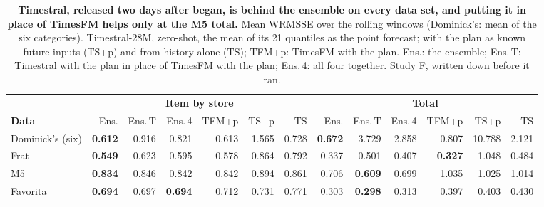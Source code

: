 \begin{table}[t]
\centering
\caption{\textbf{Timestral, released two days after \thisrev{} began, is behind the ensemble on every data set, and
putting it in place of TimesFM helps only at the M5 total.} Mean WRMSSE over the rolling windows (Dominick's: mean
of the six categories). Timestral-28M, zero-shot, the mean of its 21 quantiles as the point forecast; with the plan as
known future inputs (TS+p) and from history alone (TS); TFM+p: TimesFM with the plan. Ens.: the ensemble; Ens.\,T:
Timestral with the plan in place of TimesFM with the plan; Ens.\,4: all four together. Study F, written down before it ran.}
\label{tab:timestral}
\footnotesize
\setlength{\tabcolsep}{3pt}
\begin{tabular}{l*{12}{r}}
\toprule
 & \multicolumn{6}{c}{\textbf{Item by store}} & \multicolumn{6}{c}{\textbf{Total}} \\
\cmidrule(lr){2-7}\cmidrule(lr){8-13}
\textbf{Data} & Ens. & Ens.\,T & Ens.\,4 & TFM+p & TS+p & TS & Ens. & Ens.\,T & Ens.\,4 & TFM+p & TS+p & TS \\
\midrule
Dominick's (six) & \textbf{0.612} & 0.916 & 0.821 & 0.613 & 1.565 & 0.728 & \textbf{0.672} & 3.729 & 2.858 & 0.807 & 10.788 & 2.121 \\
Frat & \textbf{0.549} & 0.623 & 0.595 & 0.578 & 0.864 & 0.792 & 0.337 & 0.501 & 0.407 & \textbf{0.327} & 1.048 & 0.484 \\
M5 & \textbf{0.834} & 0.846 & 0.842 & 0.842 & 0.894 & 0.861 & 0.706 & \textbf{0.609} & 0.699 & 1.035 & 1.025 & 1.014 \\
Favorita & \textbf{0.694} & 0.697 & \textbf{0.694} & 0.712 & 0.731 & 0.771 & 0.303 & \textbf{0.298} & 0.313 & 0.397 & 0.403 & 0.430 \\
\bottomrule
\end{tabular}
\end{table}
